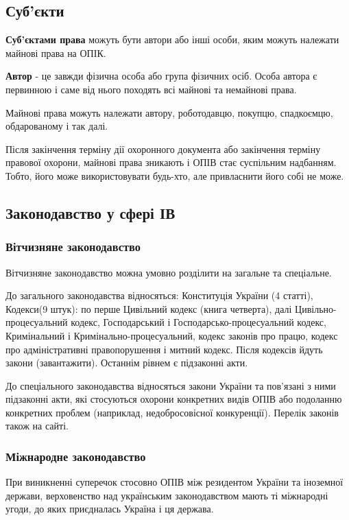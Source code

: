 \subsection{Суб’єкти} 
\textbf{Суб’єктами права} можуть бути автори або інші особи, яким можуть належати майнові права на ОПІК.

\textbf{Автор} - це завжди фізична особа або група фізичних осіб. Особа автора є первинною і саме від нього походять всі майнові та немайнові права. 

Майнові права можуть належати автору, роботодавцю, покупцю, спадкоємцю, обдарованому і так далі.

Після закінчення терміну дії охоронного документа або закінчення терміну правової охорони, майнові права зникають і ОПІВ стає суспільним надбанням. Тобто, його може використовувати будь-хто, але привласнити його собі не може. 

\subsection{Законодавство у сфері ІВ}
\subsubsection{Вітчизняне законодавство}
Вітчизняне законодавство можна умовно розділити на загальне та спеціальне.  

До загального законодавства відносяться: Конституція України (4 статті), Кодекси(9 штук): по перше Цивільний кодекс (книга четверта), далі Цивільно-процесуальний кодекс, Господарський і Господарсько-процесуальний кодекс, Кримінальний і Кримінально-процесуальний, кодекс законів про працю, кодекс про адміністративні правопорушення і митний кодекс. Після кодексів йдуть закони (завантажити). Останнім рівнем є підзаконні акти.

До спеціального законодавства відносяться закони України та пов’язані з ними підзаконні акти, які стосуються охорони конкретних видів ОПІВ або подоланню конкретних проблем (наприклад, недобросовісної конкуренції). Перелік законів також на сайті.

\subsubsection{Міжнародне законодавство}

При виникненні суперечок стосовно ОПІВ між резидентом України та іноземної держави, верховенство над українським законодавством мають ті міжнародні угоди, до яких приєдналась Україна і ця держава.

